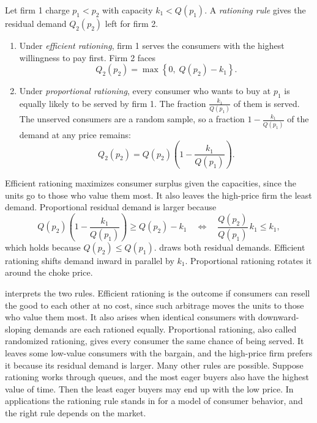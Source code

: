 \begin{definition}\label{def:02-rationing}
Let firm 1 charge $p_1 < p_2$ with capacity $k_1 < Q(p_1)$. A \emph{rationing rule} gives the residual demand
$Q_2(p_2)$ left for firm 2.
\begin{enumerate}[label=(\roman*)]
\item Under \emph{efficient rationing}, firm 1 serves the consumers with the highest willingness to pay first. Firm 2
  faces
  \begin{equation*}
  Q_2(p_2) = \max\left\{0,\; Q(p_2) - k_1\right\}.
  \end{equation*}
\item Under \emph{proportional rationing}, every consumer who wants to buy at $p_1$ is equally likely to be served
  by firm 1. The fraction $\frac{k_1}{Q(p_1)}$ of them is served. The unserved consumers are a random sample, so a
  fraction $1 - \frac{k_1}{Q(p_1)}$ of the demand at any price remains:
  \begin{equation*}
  Q_2(p_2) = Q(p_2)\left(1 - \frac{k_1}{Q(p_1)}\right).
  \end{equation*}
\end{enumerate}
\end{definition}

Efficient rationing maximizes consumer surplus given the capacities, since the units go to those who value them most.
It also leaves the high-price firm the least demand. Proportional residual demand is larger because
\begin{equation*}
Q(p_2)\left(1 - \frac{k_1}{Q(p_1)}\right) \ge Q(p_2) - k_1
\quad\Longleftrightarrow\quad
\frac{Q(p_2)}{Q(p_1)}\, k_1 \le k_1 ,
\end{equation*}
which holds because $Q(p_2) \le Q(p_1)$.  draws both residual demands. Efficient rationing
shifts demand inward in parallel by $k_1$. Proportional rationing rotates it around the choke price.

\citet[sec.~5.3.1]{Tirole1988} interprets the two rules. Efficient rationing is the outcome if consumers can resell the
good to each other at no cost, since such arbitrage moves the units to those who value them most. It also arises when
identical consumers with downward-sloping demands are each rationed equally. Proportional rationing, also called
randomized rationing, gives every consumer the same chance of being served. It leaves some low-value consumers with the
bargain, and the high-price firm prefers it because its residual demand is larger. Many other rules are possible.
Suppose rationing works through queues, and the most eager buyers also have the highest value of time. Then the least
eager buyers may end up with the low price. In applications the rationing rule stands in for a model of consumer
behavior, and the right rule depends on the market.

